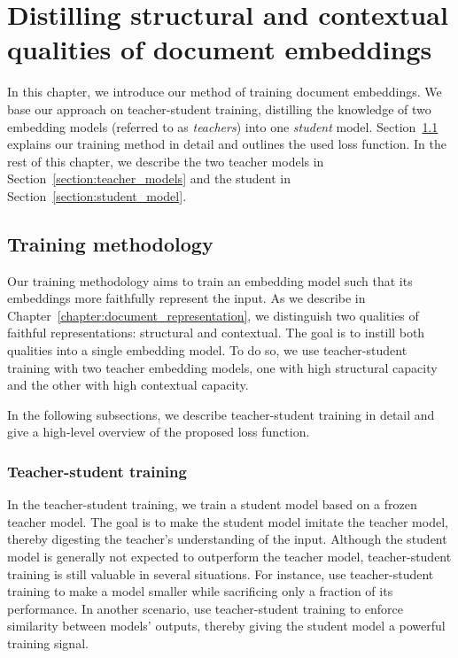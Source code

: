 \chapter{Distilling structural and contextual qualities of document
embeddings}\label{chapter:training_method}

In this chapter, we introduce our method of training document embeddings. We
base our approach on teacher-student training, distilling the knowledge of two
embedding models (referred to as \emph{teachers}) into one  \emph{student}
model. Section~\ref{section:training_method} explains our training method in
detail and outlines the used loss function. In the rest of this chapter, we
describe the two teacher models in Section~\ref{section:teacher_models} and the
student in Section~\ref{section:student_model}.

\section{Training methodology}\label{section:training_method}

Our training methodology aims to train an embedding model such that its
embeddings more faithfully represent the input. As we describe in
Chapter~\ref{chapter:document_representation}, we distinguish two qualities of
faithful representations: structural and contextual. The goal is to instill
both qualities into a single embedding model. To do so, we use teacher-student
training with two teacher embedding models, one with high structural capacity
and the other with high contextual capacity.

In the following subsections, we describe teacher-student training in detail
and give a high-level overview of the proposed loss function.

\subsection{Teacher-student training}

In the teacher-student training, we train a student model based on a frozen
teacher model. The goal is to make the student model imitate the teacher model,
thereby digesting the teacher's understanding of the input. Although the
student model is generally not expected to outperform the teacher model,
teacher-student training is still valuable in several situations. For instance,
\cite{sanh2019distilbert} use teacher-student training to make a model smaller
while sacrificing only a fraction of its performance. In another scenario,
\cite{reimers2020making} use teacher-student training to enforce similarity
between models' outputs, thereby giving the student model a powerful training
signal.

